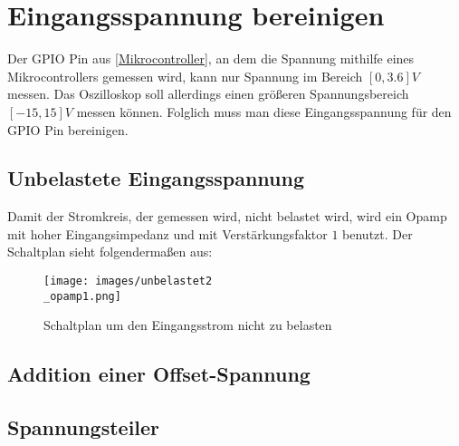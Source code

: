 \section{Eingangsspannung bereinigen}
\label{Eingangsspannung bereinigen}

Der GPIO Pin aus \ref{Mikrocontroller}, an dem die Spannung mithilfe eines Mikrocontrollers gemessen wird,
kann nur Spannung im Bereich $[0, 3.6]V$ messen.
Das Oszilloskop soll allerdings einen größeren Spannungsbereich $[-15, 15]V$ messen können.
Folglich muss man diese Eingangsspannung für den GPIO Pin bereinigen.

\subsection{Unbelastete Eingangsspannung}
\label{Unbelastete Eingangsspannung}
Damit der Stromkreis, der gemessen wird, nicht belastet wird, wird ein Opamp mit hoher Eingangsimpedanz
und mit Verstärkungsfaktor $1$ benutzt.
Der Schaltplan sieht folgendermaßen aus:
\begin{figure}[h]
	\centering
	\texttt{[image: images/unbelastet2\\\_opamp1.png]}
	\caption{Schaltplan um den Eingangsstrom nicht zu belasten}
\end{figure}


\subsection{Addition einer Offset-Spannung}
\label{Addition einer Offset-Spannung}

\subsection{Spannungsteiler}
\label{Spannungsteiler}
